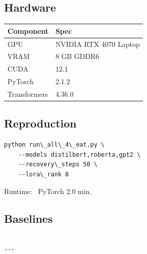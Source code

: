 \subsection{Hardware}

\begin{table}[H]
\centering
\small
\begin{tabular}{ll}
\toprule
\textbf{Component} & \textbf{Spec} \\
\midrule
GPU & NVIDIA RTX 4070 Laptop \\
VRAM & 8 GB GDDR6 \\
CUDA & 12.1 \\
PyTorch & 2.1.2 \\
Transformers & 4.36.0 \\
\bottomrule
\end{tabular}
\end{table}

\subsection{Reproduction}

\begin{lstlisting}
python run\_all\_4\_eat.py \
    --models distilbert,roberta,gpt2 \
    --recovery\_steps 50 \
    --lora\_rank 8
\end{lstlisting}

Runtime: ~PyTorch 2.0 min.

\subsection{Baselines}

\begin{lstlisting}

---
\end{lstlisting}